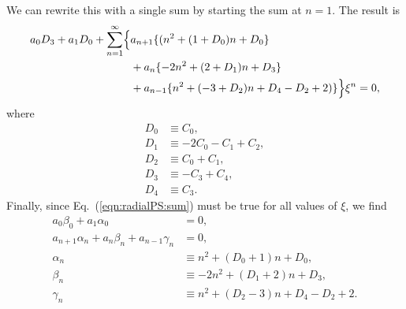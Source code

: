 \documentclass[11pt]{article}
\begin{document}
We can rewrite this with a single sum by starting the sum at
$n=1$.  The result is
\begin{equation}\label{eqn:radialPS:sum}
\begin{aligned}
  a_0D_3 + a_1D_0 +
  \sum_{n=1}^\infty\Bigl\{& a_{n+1}\{(n^2 + (1+D_0)n + D_0\} \\
    & \mbox{} + a_n\{-2n^2 + (2+D_1)n + D_3\} \\
    & \mbox{} + a_{n-1}\{n^2 + (-3+D_2)n + D_4 - D_2 + 2)\}\Bigr\}\xi^n =0,
\end{aligned}
\end{equation}
where
\begin{align}
  D_0 &\equiv C_0, \\
  D_1 &\equiv -2C_0-C_1+C_2, \\
  D_2 &\equiv C_0+C_1, \\
  D_3 &\equiv -C_3+C_4, \\
  D_4 &\equiv C_3.
\end{align}
Finally, since Eq.~(\ref{eqn:radialPS:sum}) must be true for all values
of $\xi$, we find
\begin{align}
  a_0\beta_0 + a_1\alpha_0 &= 0, \\
  a_{n+1}\alpha_n + a_n\beta_n + a_{n-1}\gamma_n &=0, \\
  \alpha_n &\equiv n^2 + (D_0+1)n + D_0, \\
  \beta_n &\equiv -2n^2 + (D_1+2)n + D_3, \\
  \gamma_n &\equiv n^2 + (D_2-3)n +D_4 - D_2 +2.
\end{align}

\newpage
{}
\vspace{0.25in}
\end{document}
